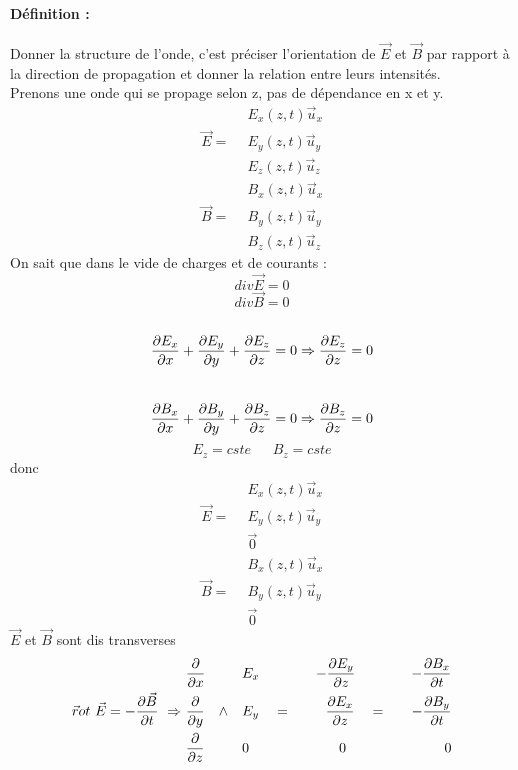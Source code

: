 \documentclass[11pt,a4paper,french]{article}
\begin{document}
\paragraph{Définition :}
Donner la structure de l'onde, c'est préciser l'orientation de $\vec E$ et $\vec B$ par rapport à la direction de propagation et donner la relation entre leurs intensités. \\
Prenons une onde qui se propage selon z, pas de dépendance en x et y.
\begin{align*}
& E_x(z, t)\vec u_x \\
\vec E = ~~& E_y(z, t) \vec u_y \\
& E_z(z, t) \vec u_z
\end{align*}
\begin{align*}
& B_x(z, t)\vec u_x \\
\vec B = ~~& B_y(z, t) \vec u_y \\
& B_z(z, t) \vec u_z
\end{align*}
On sait que dans le vide de charges et de courants : \\
$$div \vec E = 0$$
$$div \vec B = 0$$ \\
$${\partial E_x \over \partial x} + {\partial E_y \over \partial y} + {\partial E_z \over \partial z} = 0 \Rightarrow {\partial E_z \over \partial z} = 0$$ \\
$${\partial B_x \over \partial x} + {\partial B_y \over \partial y} + {\partial B_z \over \partial z} = 0 \Rightarrow {\partial B_z \over \partial z} = 0$$
$$E_z = cste~~~~~~~B_z = cste$$
donc
\begin{align*}
& E_x(z, t)\vec u_x \\
\vec E = ~~& E_y(z, t) \vec u_y \\
& \vec 0
\end{align*}
\begin{align*}
& B_x(z, t)\vec u_x \\
\vec B = ~~& B_y(z, t) \vec u_y \\
&\vec 0
\end{align*}
$\vec E$ et $\vec B$ sont dis transverses
\clearpage
\begin{align*}
&{\partial \over \partial x} 
&&E_x 
&&&-{\partial E_y \over \partial z}~~~~~~
&&&& - {\partial B_x \over \partial t}\\
\vec rot~\vec E = -{\partial \vec B \over \partial t}~\Rightarrow~
&{\partial \over \partial y}~~~\wedge 
&&E_y ~~~ = 
&&&{\partial E_x \over \partial z}~~~ =
&&&& -{\partial B_y \over \partial t}\\
&{\partial \over \partial z} 
&& 0
&&& 0~~~~~~~~
&&&& 0\\
\end{align*}
\end{document}
